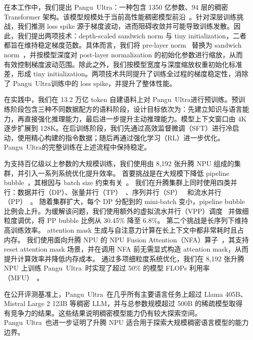 \documentclass{article}
\newcommand{\pangu}{Pangu}
\newcommand{\modelname}{\pangu~Ultra}
\begin{document}
在本工作中，我们提出 \modelname：一种包含 1350 亿参数、94 层的稠密 Transformer 架构。该模型规模处于当前高性能稠密模型前沿~\cite{bai2023qwen,yang2024qwen2,grattafiori2024llama,team2024gemma}。针对深层训练挑战，我们推测 loss spike 源于梯度波动，进而阻碍收敛并可能导致训练发散。因此，我们提出两项技术：depth-scaled sandwich norm 与 tiny initialization，二者都旨在维持稳定梯度范数。具体而言，我们将 pre-layer norm~\cite{DBLP:conf/emnlp/LiuLGCH20} 替换为 sandwich norm~\cite{NEURIPS2021_CogView}，并按模型深度对 post-layer normalization 的初始化参数进行缩放，从而有效控制梯度波动范围。除此之外，我们按模型宽度与深度缩放权重初始化标准差，形成 tiny initialization。两项技术共同提升了训练全过程的梯度稳定性，消除了 \modelname 训练中的 loss spike，并提升了整体性能。

在实践中，我们在 13.2 万亿 token 自建语料上对 \modelname 进行预训练。预训练阶段包含三种不同数据配方的语料阶段，设计目标依次为：先建立知识与语言能力，再直接强化推理能力，最后进一步提升主动推理能力。模型上下文窗口由 4K 逐步扩展到 128K。在后训练阶段，我们先通过高效监督微调（SFT）进行冷启动，使用精心构建的指令数据；随后再通过强化学习（RL）进一步优化。\modelname 的完整训练在上述流程中保持稳定。

为支持百亿级以上参数的大规模训练，我们使用由 8,192 张升腾 NPU 组成的集群，并引入一系列系统优化提升效率。
首要挑战是在大规模下降低 pipeline bubble~\cite{huang2019gpipe}，其根因与 batch size 约束有关~\cite{megascale}。
我们在升腾集群上同时使用四类并行：数据并行（DP）、张量并行（TP）~\cite{megatron-lm}、序列并行（SP）~\cite{megatron-sp} 和流水并行（PP）~\cite{gpipe,pipedream}。
随着集群扩大，每个 DP 分配到的 mini-batch 变小，pipeline bubble 比例会上升。为缓解该问题，我们使用额外的虚拟流水并行（VPP）调度~\cite{interleaved-pp} 并做细粒度调优，将 PP bubble 比例从 30.45\% 降至 6.8\%。
第二个挑战是长序列下维持高训练效率。
attention mask 生成与自注意力计算在长上下文中都非常耗时且占内存。
我们使用面向升腾 NPU 的 NPU Fusion Attention（NFA）算子~\cite{fa-github, flash_attention, flash_attention2}，其支持 reset attention mask 场景，并在调用 NFA 前无需显式构造 attention mask，从而提升计算效率并降低内存成本。
通过多项细粒度系统优化，我们在 8,192 张升腾 NPU 上训练 \modelname~时实现了超过 50\% 的模型 FLOPs 利用率（MFU）~\cite{palm}。

在公开评测基准上，\modelname~在几乎所有主要语言任务上超过 Llama 405B、Mistral Large 2 123B 等稠密 LLM，并与总参数规模超过 500B 的稀疏模型取得有竞争力的结果。这些结果说明稠密模型能力仍有较大探索空间。\modelname~也进一步证明了升腾 NPU 适合用于探索大规模稠密语言模型的能力边界。
\end{document}
